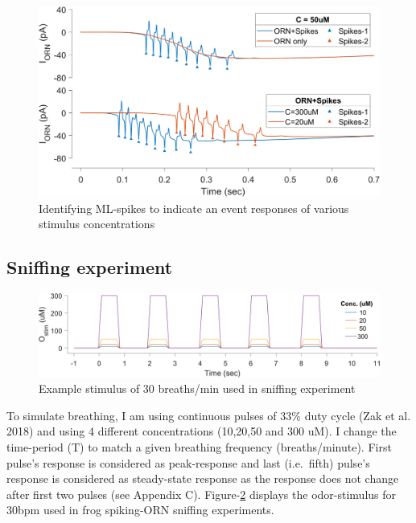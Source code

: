 \documentclass[
]{article}
\begin{document}
\begin{figure}

{\centering \includegraphics[width=0.8\linewidth]{figs/v1/fig_ML_spikes_ID} 

}

\caption{Identifying ML-spikes to indicate an event responses of various stimulus concentrations}\label{fig:MLspkID}
\end{figure}

\hypertarget{sniffing-experiment}{%
\subsection{Sniffing experiment}\label{sniffing-experiment}}

\begin{figure}

{\centering \includegraphics[width=0.9\linewidth]{figs/v1/fig_sniff_pulse} 

}

\caption{Example stimulus of 30 breaths/min used in sniffing experiment}\label{fig:pulse}
\end{figure}

To simulate breathing, I am using continuous pulses of 33\% duty cycle (Zak et al. 2018) and using 4 different concentrations (10,20,50 and 300 uM). I change the time-period (T) to match a given breathing frequency (breaths/minute). First pulse's response is considered as peak-response and last (i.e.~fifth) pulse's response is considered as steady-state response as the response does not change after first two pulses (see Appendix C). Figure-\ref{fig:pulse} displays the odor-stimulus for 30bpm used in frog spiking-ORN sniffing experiments.
\end{document}
